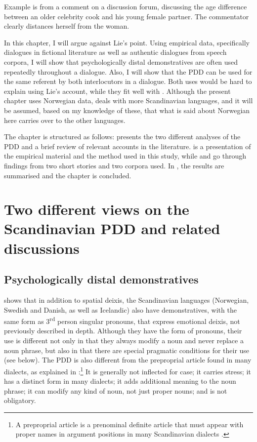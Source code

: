\documentclass[output=paper,colorlinks,citecolor=brown]{langscibook}
\begin{document}
Example  is from a comment on a discussion forum, discussing the age difference between an older celebrity cook and his young female partner. The commentator clearly distances herself from the woman.

In this chapter, I will argue against Lie’s point. Using empirical data, specifically dialogues in fictional literature as well as authentic dialogues from speech corpora, I will show that psychologically distal demonstratives are often used repeatedly throughout a dialogue. Also, I will show that the PDD can be used for the same referent by both interlocutors in a dialogue. Both uses would be hard to explain using Lie’s account, while they fit well with \citet{Johannessen2008}. Although the present chapter uses Norwegian data, \citet{Johannessen2008} deals with more Scandinavian languages, and it will be assumed, based on my knowledge of these, that what is said about Norwegian here carries over to the other languages.

The chapter is structured as follows:  presents the two different analyses of the PDD and a brief review of relevant accounts in the literature.  is a presentation of the empirical material and the method used in this study, while  and  go through findings from two short stories and two corpora used. In , the results are summarised and the chapter is concluded.

\section{Two different views on the Scandinavian PDD and related discussions}\label{sec:johannessen:2}
\subsection{Psychologically distal demonstratives \citep{Johannessen2008}}\label{sec:johannessen:2.1}

\citet{Johannessen2008} shows that in addition to spatial deixis, the Scandinavian languages (Norwegian, Swedish and Danish, as well as Icelandic) also have demonstratives, with the same form as 3\textsuperscript{rd} person singular pronouns, that express emotional deixis, not previously described in depth. Although they have the form of pronouns, their use is different not only in that they always modify a noun and never replace a noun phrase, but also in that there are special pragmatic conditions for their use (see below). The PDD is also different from the preproprial article found in many dialects, as explained in \citet[169–170]{Johannessen2008}:\footnote{A preproprial article is a prenominal definite article that must appear with proper names in argument positions in many Scandinavian dialects \citep{JohannessenGarbacz2014}.} It is generally not inflected for case; it carries stress; it has a distinct form in many dialects; it adds additional meaning to the noun phrase; it can modify any kind of noun, not just proper nouns; and is not obligatory.
\end{document}
